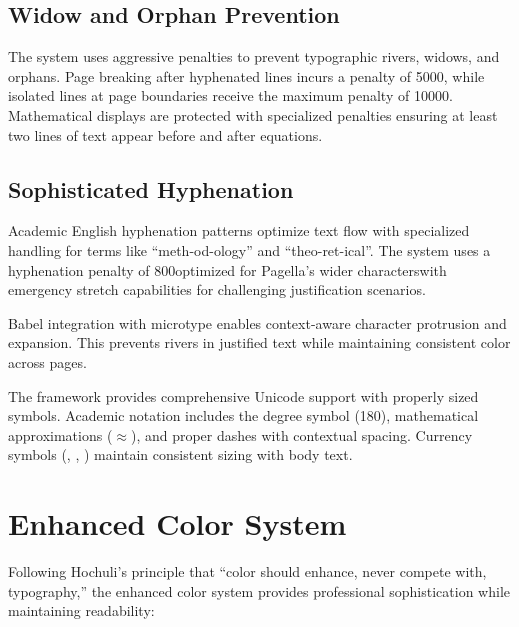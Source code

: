 \documentclass[11pt]{article}
\begin{document}
\subsection{Widow and Orphan Prevention}

The system uses aggressive penalties to prevent typographic rivers, widows, and orphans. Page breaking after hyphenated lines incurs a penalty of 5000, while isolated lines at page boundaries receive the maximum penalty of 10000. Mathematical displays are protected with specialized penalties ensuring at least two lines of text appear before and after equations.

\subsection{Sophisticated Hyphenation}

Academic English hyphenation patterns optimize text flow with specialized handling for terms like \enquote{meth-od-ology} and \enquote{theo-ret-ical}. The system uses a hyphenation penalty of 800\emdash{}optimized for Pagella's wider characters\emdash{}with emergency stretch capabilities for challenging justification scenarios.

 Babel integration with microtype enables context-aware character protrusion and expansion. This prevents rivers in justified text while maintaining consistent color across pages.

 The framework provides comprehensive Unicode support with properly sized symbols. Academic notation includes the degree symbol (180\textdegree), mathematical approximations ($\approx$), and proper dashes with contextual spacing. Currency symbols (\texteuro, \textsterling, \textyen) maintain consistent sizing with body text.

\section{Enhanced Color System}

Following Hochuli's principle that \enquote{color should enhance, never compete with, typography,} the enhanced color system provides professional sophistication while maintaining readability:
\end{document}
